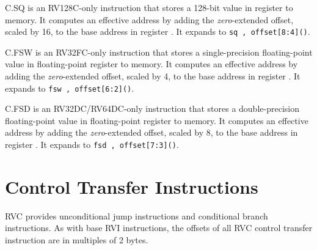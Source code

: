 C.SQ is an RV128C-only instruction that stores a 128-bit value in register
{\em \rstwoprime} to memory.  It computes an effective address by adding the {\em
zero}-extended offset, scaled by 16, to the base address in register {\em
\rsoneprime}.
It expands to {\tt sq \rstwoprime, offset[8:4](\rsoneprime)}.

C.FSW is an RV32FC-only instruction that stores a single-precision
floating-point value in floating-point register {\em \rstwoprime} to memory.  It
computes an effective address by adding the {\em zero}-extended offset, scaled
by 4, to the base address in register {\em \rsoneprime}.  It expands to {\tt fsw
\rstwoprime, offset[6:2](\rsoneprime)}.

C.FSD is an RV32DC/RV64DC-only instruction that stores a double-precision
floating-point value in floating-point register {\em \rstwoprime} to memory.  It
computes an effective address by adding the {\em zero}-extended offset, scaled
by 8, to the base address in register {\em \rsoneprime}.  It expands to {\tt fsd
\rstwoprime, offset[7:3](\rsoneprime)}.

\section{Control Transfer Instructions}

RVC provides unconditional jump instructions and conditional branch
instructions. As with base RVI instructions, the offsets of all RVC
control transfer instruction are in multiples of 2 bytes.

